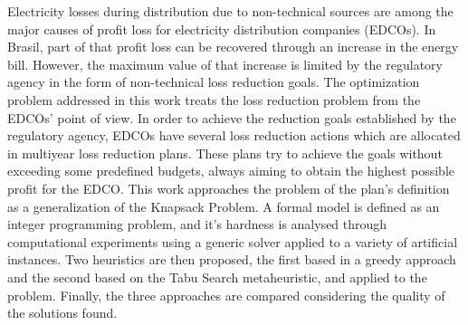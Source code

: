 Electricity losses during distribution due to non-technical sources are among the major causes of 
profit loss for electricity distribution companies (EDCOs). In Brasil, part of that profit loss can be
recovered through an increase in the energy bill. However, the maximum value of that increase is 
limited by the regulatory agency in the form of non-technical loss reduction goals. The optimization 
problem addressed in this work treats the loss reduction problem from the EDCOs' point of view. 
In order to achieve the reduction goals established by the regulatory agency, EDCOs
have several loss reduction actions which are allocated in multiyear loss reduction plans. 
These plans try to achieve the goals without exceeding some predefined budgets,
always aiming to obtain the highest possible profit for the EDCO. This work approaches
the problem of the plan's definition as a generalization of the Knapsack Problem.
A formal model is defined as an integer programming problem, and it's hardness is analysed
through computational experiments using a generic solver applied to a variety of
artificial instances. Two heuristics are then proposed, the first
based in a greedy approach and the second based on the Tabu Search metaheuristic, and applied
to the problem. Finally, the three approaches are compared considering the quality of the
solutions found.

